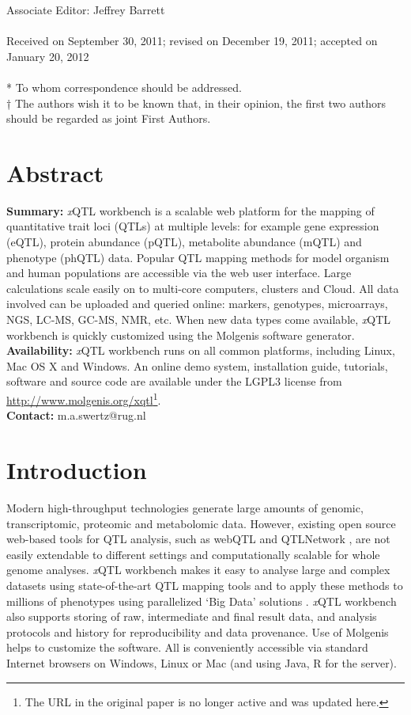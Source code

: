 \noindent
Associate Editor: Jeffrey Barrett
\\~\\
Received on September 30, 2011; revised on December 19, 2011; accepted on January 20, 2012
\\~\\
* To whom correspondence should be addressed.\\
† The authors wish it to be known that, in their opinion, the first two authors should be regarded as joint First Authors.

\section*{Abstract}
\textbf{Summary:} \textsl{x}QTL workbench is a scalable web platform for the mapping of quantitative trait loci (QTLs) at multiple levels: for example gene expression (eQTL), protein abundance (pQTL), metabolite abundance (mQTL) and phenotype (phQTL) data. Popular QTL mapping methods for model organism and human populations are accessible via the web user interface. Large calculations scale easily on to multi-core computers, clusters and Cloud. All data involved can be uploaded and queried online: markers, genotypes, microarrays, NGS, LC-MS, GC-MS, NMR, etc. When new data types come available, \textsl{x}QTL workbench is quickly customized using the Molgenis software generator.\\
\textbf{Availability:} \textsl{x}QTL workbench runs on all common platforms, including Linux, Mac OS X and Windows. An online demo system, installation guide, tutorials, software and source code are available under the LGPL3 license from \url{http://www.molgenis.org/xqtl}\footnote{The URL in the original paper is no longer active and was updated here.}.\\
\textbf{Contact:} m.a.swertz@rug.nl

\section{Introduction}
Modern high-throughput technologies generate large amounts of genomic, transcriptomic, proteomic and metabolomic data. However, existing open source web-based tools for QTL analysis, such as webQTL \cite{Wang_2003} and QTLNetwork \cite{Yang_2008}, are not easily extendable to different settings and computationally scalable for whole genome analyses. \textsl{x}QTL workbench makes it easy to analyse large and complex datasets using state-of-the-art QTL mapping tools and to apply these methods to millions of phenotypes using parallelized ‘Big Data’ solutions \cite{Trelles_2011}. \textsl{x}QTL workbench also supports storing of raw, intermediate and final result data, and analysis protocols and history for reproducibility and data provenance. Use of Molgenis \cite{Swertz_2010a} helps to customize the software. All is conveniently accessible via standard Internet browsers on Windows, Linux or Mac (and using Java, R for the server).

